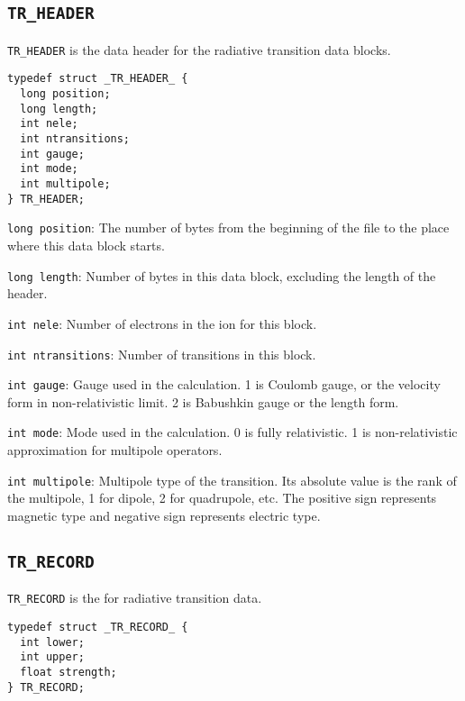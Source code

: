 \subsection{\texttt{TR\_HEADER}}
\texttt{TR\_HEADER} is the data header for the radiative transition data
blocks. 

\begin{verbatim}
typedef struct _TR_HEADER_ {
  long position;
  long length;
  int nele;
  int ntransitions;
  int gauge;
  int mode;
  int multipole;
} TR_HEADER;
\end{verbatim}

\begin{dbdesc}
\item[\texttt{long position}:] The number of bytes from the beginning of the
file to the place where this data block starts.
\item[\texttt{long length}:] Number of bytes in this data block, excluding the
length of the header.
\item[\texttt{int nele}:] Number of electrons in the ion for this block.
\item[\texttt{int ntransitions}:] Number of transitions in this block.
\item[\texttt{int gauge}:] Gauge used in the calculation. 1 is Coulomb gauge, or
the velocity form in non-relativistic limit. 2 is Babushkin gauge or the
length form.
\item[\texttt{int mode}:] Mode used in the calculation. 0 is fully
relativistic. 1 is non-relativistic approximation for multipole operators.
\item[\texttt{int multipole}:] Multipole type of the transition. Its absolute
value is the rank of the multipole, 1 for dipole, 2 for quadrupole, etc. The
positive sign represents magnetic type and negative sign represents electric
type.
\end{dbdesc}

\subsection{\texttt{TR\_RECORD}}
\texttt{TR\_RECORD} is the for radiative transition data.

\begin{verbatim}
typedef struct _TR_RECORD_ {
  int lower;
  int upper;
  float strength;
} TR_RECORD;
\end{verbatim}

